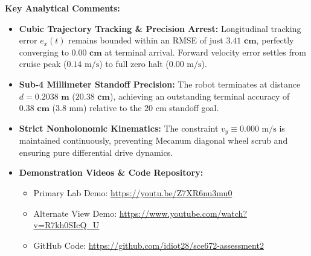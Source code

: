 \documentclass[10pt,a4paper]{article}
\begin{document}
\noindent\textbf{Key Analytical Comments:}
\begin{itemize}[noitemsep,topsep=1pt]
    \item \textbf{Cubic Trajectory Tracking \& Precision Arrest:} Longitudinal tracking error $e_x(t)$ remains bounded within an RMSE of just $\mathbf{3.41\text{~cm}}$, perfectly converging to $\mathbf{0.00\text{~cm}}$ at terminal arrival. Forward velocity error settles from cruise peak ($0.14\text{~m/s}$) to full zero halt ($0.00\text{~m/s}$).
    \item \textbf{Sub-4 Millimeter Standoff Precision:} The robot terminates at distance $d = \mathbf{0.2038\text{~m}}$ ($\mathbf{20.38\text{~cm}}$), achieving an outstanding terminal accuracy of $\mathbf{0.38\text{~cm}}$ ($3.8\text{~mm}$) relative to the $20\text{~cm}$ standoff goal.
    \item \textbf{Strict Nonholonomic Kinematics:} The constraint $v_y \equiv 0.000\text{~m/s}$ is maintained continuously, preventing Mecanum diagonal wheel scrub and ensuring pure differential drive dynamics.
    \item \textbf{Demonstration Videos \& Code Repository:}
    \begin{itemize}[noitemsep,topsep=1pt]
        \item Primary Lab Demo: \href{https://youtu.be/Z7XR6nu3mu0?si=uz1j3nOYoMPpDBvn}{\url{https://youtu.be/Z7XR6nu3mu0}}
        \item Alternate View Demo: \href{https://www.youtube.com/watch?v=R7kh0SIcQ_U}{\url{https://www.youtube.com/watch?v=R7kh0SIcQ_U}}
        \item GitHub Code: \href{https://github.com/idiot28/sce672-assessment2}{\url{https://github.com/idiot28/sce672-assessment2}}
    \end{itemize}
\end{itemize}
\end{document}
